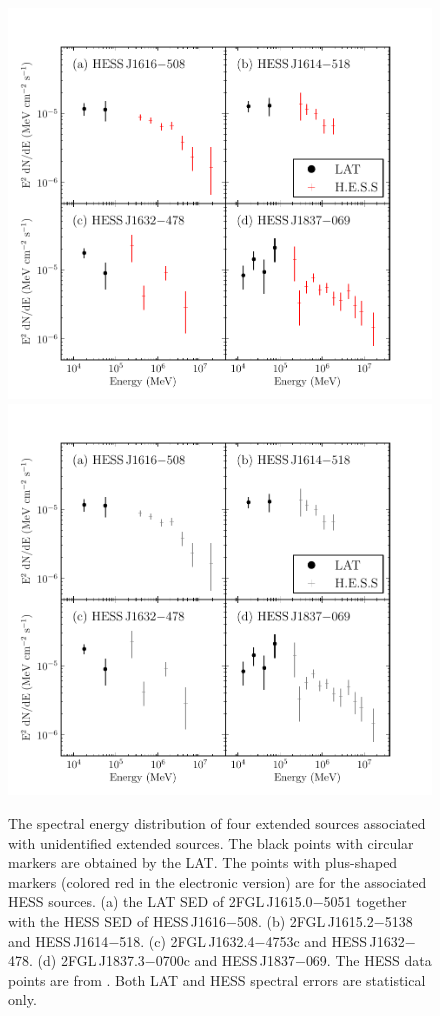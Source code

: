 \begin{figure}[htbp]
    \ifcolorfigure
      \includegraphics{chapters/extended_search/figures/summary_plots/hess_seds_color.pdf}
    \else
      \includegraphics{chapters/extended_search/figures/summary_plots/hess_seds_bw.pdf}
    \fi
    \caption{
    The spectral energy distribution of four extended
    sources associated with unidentified
    extended \tev sources.  The black points
    with circular markers are obtained by the LAT. The points with
    plus-shaped markers (colored red in the electronic version) are
    for the associated \ac{HESS} sources.  (a) the
    LAT SED of 2FGL\,J1615.0$-$5051 together with the \ac{HESS} SED
    of HESS\,J1616$-$508. (b) 2FGL\,J1615.2$-$5138
    and HESS\,J1614$-$518. (c) 2FGL\,J1632.4$-$4753c
    and HESS\,J1632$-$478. (d) 2FGL\,J1837.3$-$0700c
    and HESS\,J1837$-$069. The \ac{HESS} data points are from
    \citep{aharonian_2006a_h.e.s.s.-survey}. Both LAT and \ac{HESS} spectral errors are
    statistical only.}
  \end{figure}


